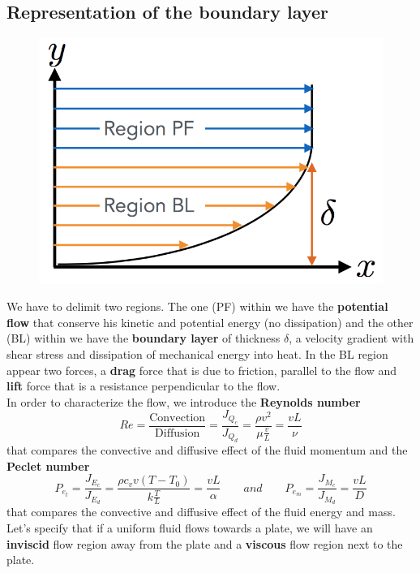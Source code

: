 \newpage
	
\subsection{Representation of the boundary layer}
\begin{figure}
	\vspace{-5mm}
	\includegraphics[scale=0.3]{ch1/11}
\end{figure}
We have to delimit two regions. The one (PF) within we have the \textbf{potential flow} that conserve his kinetic and potential energy (no dissipation) and the other (BL) within we have the \textbf{boundary layer} of thickness $\delta$, a velocity gradient with shear stress and dissipation of mechanical energy into heat. In the BL region appear two forces, a \textbf{drag} force that is due to friction, parallel to the flow and \textbf{lift} force that is a resistance perpendicular to the flow.  \\
In order to characterize the flow, we introduce the \textbf{Reynolds number}\\
\begin{equation}
	Re = \frac{\mbox{Convection}}{\mbox{Diffusion}} = \frac{J_{Q_c}}{J_{Q_d}} = \frac{\rho v^2}{\mu \frac{v}{L}} = \frac{vL}{\nu}
\end{equation}
that compares the convective and diffusive effect of the fluid momentum and the \textbf{Peclet number}
\begin{equation}
	P_{e_t} = \frac{J_{E_c}}{J_{E_d}} = \frac{\rho c_v v (T- T_0)}{k\frac{T}{L}} = \frac{vL}{\alpha} 
	\qquad and \qquad 
	P_{e_m} = \frac{J_{M_c}}{J_{M_d}} = \frac{vL}{D} 	
\end{equation}
that compares the convective and diffusive effect of the fluid energy and mass. Let's specify that if a uniform fluid flows towards a plate, we will have an \textbf{inviscid} flow region away from the plate and a \textbf{viscous} flow region next to the plate.
	
